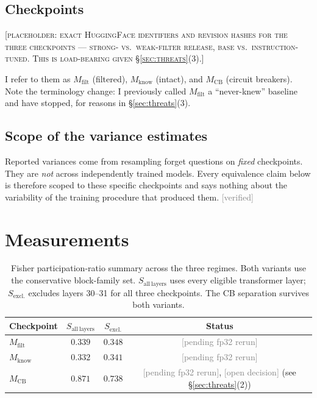 \documentclass[11pt]{article}
\newcommand{\status}[1]{\textcolor{gray}{\footnotesize\textsf{[#1]}}}
\newcommand{\verified}{\status{verified}}
\newcommand{\pending}{\status{pending fp32 rerun}}
\newcommand{\open}{\status{open decision}}
\begin{document}
\subsection{Checkpoints}

\textsc{[placeholder: exact HuggingFace identifiers and revision hashes for the
three checkpoints --- strong- vs.\ weak-filter release, base vs.\
instruction-tuned. This is load-bearing given \S\ref{sec:threats}(3).]}

I refer to them as $M_{\mathrm{filt}}$ (filtered), $M_{\mathrm{know}}$
(intact), and $M_{\mathrm{CB}}$ (circuit breakers). Note the terminology
change: I previously called $M_{\mathrm{filt}}$ a ``never-knew'' baseline and
have stopped, for reasons in \S\ref{sec:threats}(3).

\subsection{Scope of the variance estimates}

Reported variances come from resampling forget questions on \emph{fixed}
checkpoints. They are \emph{not} across independently trained models. Every
equivalence claim below is therefore scoped to these specific checkpoints and
says nothing about the variability of the training procedure that produced
them. \verified{}

\section{Measurements}

\begin{table}[h]
\centering
\begin{tabular}{lccc}
\toprule
Checkpoint & $S_{\mathrm{all\ layers}}$ & $S_{\mathrm{excl.}}$ & Status \\
\midrule
$M_{\mathrm{filt}}$ & $0.339$ & $0.348$ & \pending{} \\
$M_{\mathrm{know}}$ & $0.332$ & $0.341$ & \pending{} \\
$M_{\mathrm{CB}}$   & $0.871$ & $0.738$ & \pending{}, \open{} (see \S\ref{sec:threats}(2)) \\
\bottomrule
\end{tabular}
\caption{Fisher participation-ratio summary across the three regimes. Both
variants use the conservative block-family set. $S_{\mathrm{all\ layers}}$
uses every eligible transformer layer; $S_{\mathrm{excl.}}$ excludes layers
30--31 for all three checkpoints. The CB separation survives both variants.}
\end{table}
\end{document}
